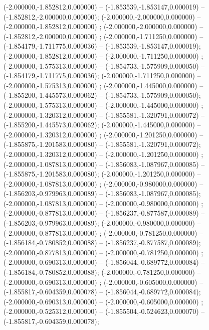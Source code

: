  (-2.000000,-1.852812,0.000000) -- (-1.853539,-1.853147,0.000019) -- (-1.852812,-2.000000,0.000000);
 (-2.000000,-2.000000,0.000000) -- (-2.000000,-1.852812,0.000000) ;
 (-2.000000,-2.000000,0.000000) -- (-1.852812,-2.000000,0.000000) ;
 (-2.000000,-1.711250,0.000000) -- (-1.854179,-1.711775,0.000036) -- (-1.853539,-1.853147,0.000019);
 (-2.000000,-1.852812,0.000000) -- (-2.000000,-1.711250,0.000000) ;
 (-2.000000,-1.575313,0.000000) -- (-1.854733,-1.575909,0.000050) -- (-1.854179,-1.711775,0.000036);
 (-2.000000,-1.711250,0.000000) -- (-2.000000,-1.575313,0.000000) ;
 (-2.000000,-1.445000,0.000000) -- (-1.855200,-1.445573,0.000062) -- (-1.854733,-1.575909,0.000050);
 (-2.000000,-1.575313,0.000000) -- (-2.000000,-1.445000,0.000000) ;
 (-2.000000,-1.320312,0.000000) -- (-1.855581,-1.320791,0.000072) -- (-1.855200,-1.445573,0.000062);
 (-2.000000,-1.445000,0.000000) -- (-2.000000,-1.320312,0.000000) ;
 (-2.000000,-1.201250,0.000000) -- (-1.855875,-1.201583,0.000080) -- (-1.855581,-1.320791,0.000072);
 (-2.000000,-1.320312,0.000000) -- (-2.000000,-1.201250,0.000000) ;
 (-2.000000,-1.087813,0.000000) -- (-1.856083,-1.087967,0.000085) -- (-1.855875,-1.201583,0.000080);
 (-2.000000,-1.201250,0.000000) -- (-2.000000,-1.087813,0.000000) ;
 (-2.000000,-0.980000,0.000000) -- (-1.856203,-0.979963,0.000089) -- (-1.856083,-1.087967,0.000085);
 (-2.000000,-1.087813,0.000000) -- (-2.000000,-0.980000,0.000000) ;
 (-2.000000,-0.877813,0.000000) -- (-1.856237,-0.877587,0.000089) -- (-1.856203,-0.979963,0.000089);
 (-2.000000,-0.980000,0.000000) -- (-2.000000,-0.877813,0.000000) ;
 (-2.000000,-0.781250,0.000000) -- (-1.856184,-0.780852,0.000088) -- (-1.856237,-0.877587,0.000089);
 (-2.000000,-0.877813,0.000000) -- (-2.000000,-0.781250,0.000000) ;
 (-2.000000,-0.690313,0.000000) -- (-1.856044,-0.689772,0.000084) -- (-1.856184,-0.780852,0.000088);
 (-2.000000,-0.781250,0.000000) -- (-2.000000,-0.690313,0.000000) ;
 (-2.000000,-0.605000,0.000000) -- (-1.855817,-0.604359,0.000078) -- (-1.856044,-0.689772,0.000084);
 (-2.000000,-0.690313,0.000000) -- (-2.000000,-0.605000,0.000000) ;
 (-2.000000,-0.525312,0.000000) -- (-1.855504,-0.524623,0.000070) -- (-1.855817,-0.604359,0.000078);
